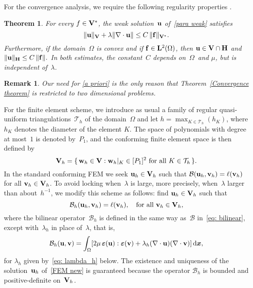 \documentclass[11pt]{article}
\newcommand{\calB}{\mathcal{B}}
\newcommand{\vf}{{\bf f}}
\newcommand{\vu}{{\bf u}}
\newcommand{\vv}{{\bf v}}
\newcommand{\vV}{{\bf V}}
\newcommand{\vw}{{\bf w}}
\newcommand{\bsx}{{\boldsymbol{x}}}
\numberwithin{equation}{section}
\newcommand{\veps}{{\boldsymbol{\varepsilon}}}
\newcommand{\ud}{\mathrm{d}}
\newtheorem{theorem}{Theorem}[section]
\newtheorem{remark}{Remark}[section]
\begin{document}
For the convergence analysis, we require the following regularity properties \cite[Lemma~2.2]{BrennerSung1992}. 
\begin{theorem}\label{lem: vu bound}
For every $f \in \vV^*$, the weak solution~$\vu$ of~\eqref{para weak} satisfies 
\begin{equation}\label{a priori}
  \|\vu\|_{\vV} + \lambda \|\nabla \cdot \vu\| \le C\,  \|\vf\|_{\vV^*}.
\end{equation}
Furthermore, if the domain~$\Omega$ is convex and if $\vf \in {\bf L}^2(\Omega)$, then 
$\vu \in \vV \cap {\bf H}$ and $\|\vu\|_{\bf H} \le  C\,\|\vf\|.$
In both estimates, the constant~$C$ depends on~$\Omega$~and $\mu$, but is independent of~$\lambda$.
\end{theorem}

\begin{remark}
Our need for \eqref{a priori}  is the only reason that Theorem~\ref{Convergence theorem} is restricted to two dimensional problems.  
\end{remark}

For the finite element scheme, we introduce as usual a family of regular 
quasi-uniform triangulations~$\mathcal{T}_h$ of the domain~$\Omega$ and let 
$h=\max_{K\in \mathcal{T}_h}(h_K)$, where $h_{K}$ denotes the diameter of 
the element $K$.  The space of polynomials with degree at most~$1$ is denoted  by~$P_1$, and the conforming finite element space is then defined by 
\[\vV_h=\{\,\vw_h \in {\bf V}:\text{$\vw_h |_K \in [P_1]^2$ for all $K \in \mathcal{T}_h$}\,\}.
\]
In the standard conforming FEM we seek $\vu_h \in  \vV_h$ such that
$\calB(\vu_h, \vv_h) = \ell(\vv_h)$ for all $\vv_h \in  \vV_h$. To
avoid locking when~$\lambda$ is large, more precisely,
when~$\lambda$ larger than about~$h^{-1}$, we modify this scheme as
follows: find $\vu_h \in  \vV_h$ such that
\begin{equation}\label{FEM new}
\calB_h(\vu_h,\vv_h)=\ell(\vv_h),\quad\text{for all $\vv_h\in\vV_h$},
\end{equation}
where the bilinear operator~$\calB_h$ is defined in the same way as~$\calB$
in~\eqref{eq: bilinear}, except with~$\lambda_h$ in place of~$\lambda$,
that is,
\begin{equation*}
\calB_h(\vu,\vv)=\int_\Omega[2\mu\,\veps(\vu):\veps(\vv)
    +\lambda_h(\nabla\cdot\vu)(\nabla\cdot\vv)]\,\ud\bsx,
\end{equation*} 
for $\lambda_h$ given by~\eqref{eq: lambda_h} below. The existence and
uniqueness of the solution~$\vu_h$ of~\eqref{FEM new} is guaranteed because the
operator $\calB_h$ is bounded and positive-definite on~$\vV_h$.
\end{document}
